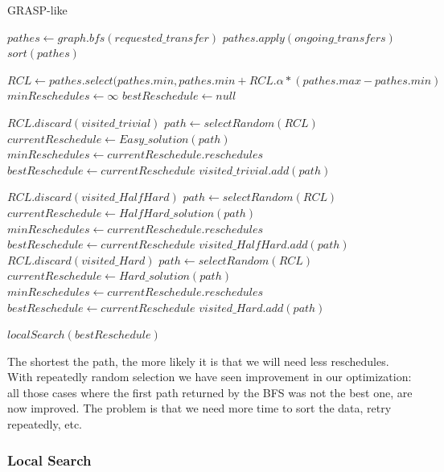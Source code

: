\documentclass[11pt,a4paper]{article}
\begin{document}
\begin{algorithm}[H]
\caption{GRASP-like}\label{grasp}
\begin{algorithmic}[1]
	\State $pathes \gets graph.bfs(requested\_transfer)$
	\State $pathes.apply(ongoing\_transfers)$
	\State $sort(pathes)$

	\State $RCL \gets pathes.select(pathes.min, pathes.min+RCL.\alpha*(pathes.max-pathes.min)$
	\State $minReschedules \gets \infty$
	\State $bestReschedule \gets null$

		\State $RCL.discard(visited\_trivial)$
		\State $path \gets selectRandom(RCL)$
		\State $currentReschedule \gets Easy\_solution(path)$
			\State $minReschedules \gets currentReschedule.reschedules$
			\State $bestReschedule \gets currentReschedule$
		\EndIf
		\State $visited\_trivial.add(path)$
	\EndFor

			\State $RCL.discard(visited\_HalfHard)$
			\State $path \gets selectRandom(RCL)$
			\State $currentReschedule \gets HalfHard\_solution(path)$
				\State $minReschedules \gets currentReschedule.reschedules$
				\State $bestReschedule \gets currentReschedule$
			\EndIf
			\State $visited\_HalfHard.add(path)$
		\EndFor
			\State $RCL.discard(visited\_Hard)$
			\State $path \gets selectRandom(RCL)$
			\State $currentReschedule \gets Hard\_solution(path)$
				\State $minReschedules \gets currentReschedule.reschedules$
				\State $bestReschedule \gets currentReschedule$
			\EndIf
			\State $visited\_Hard.add(path)$
		\EndFor

		\State $localSearch(bestReschedule)$
	\EndIf
\EndProcedure
\end{algorithmic}
\end{algorithm}

The shortest the path, the more likely it is that we will need less reschedules. With repeatedly random selection we have seen improvement in our optimization: all those cases where the first path returned by the BFS was not the best one, are now improved. The problem is that we need more time to sort the data, retry repeatedly, etc.

\subsubsection{Local Search}
\end{document}
